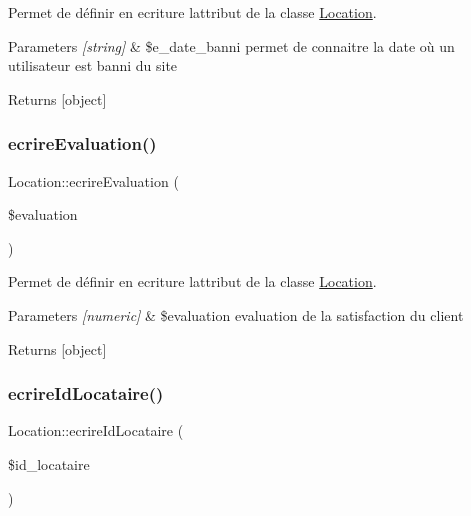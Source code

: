 Permet de définir en ecriture l\textquotesingle{}attribut de la classe \hyperlink{class_location}{Location}. 


\begin{DoxyParams}{Parameters}
{\em \mbox{[}string\mbox{]}} & \$e\+\_\+date\+\_\+banni permet de connaitre la date où un utilisateur est banni du site \\
\hline
\end{DoxyParams}
\begin{DoxyReturn}{Returns}
\mbox{[}object\mbox{]} 
\end{DoxyReturn}
\mbox{\label{class_location_a8fe8652c6584da5f2cc3dff239fd4640}} 
\subsubsection{\texorpdfstring{ecrire\+Evaluation()}{ecrireEvaluation()}}
{\footnotesize\ttfamily Location\+::ecrire\+Evaluation (\begin{DoxyParamCaption}\item[{}]{\$evaluation }\end{DoxyParamCaption})}



Permet de définir en ecriture l\textquotesingle{}attribut de la classe \hyperlink{class_location}{Location}. 


\begin{DoxyParams}{Parameters}
{\em \mbox{[}numeric\mbox{]}} & \$evaluation evaluation de la satisfaction du client \\
\hline
\end{DoxyParams}
\begin{DoxyReturn}{Returns}
\mbox{[}object\mbox{]} 
\end{DoxyReturn}
\mbox{\label{class_location_a7c548de14b0775bd29c5ff6402a75a0f}} 
\subsubsection{\texorpdfstring{ecrire\+Id\+Locataire()}{ecrireIdLocataire()}}
{\footnotesize\ttfamily Location\+::ecrire\+Id\+Locataire (\begin{DoxyParamCaption}\item[{}]{\$id\+\_\+locataire }\end{DoxyParamCaption})}



